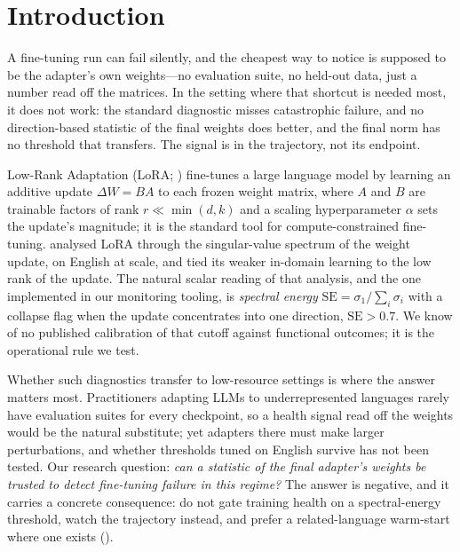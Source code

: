 \documentclass[11pt]{article}
\begin{document}
\section{Introduction}

A fine-tuning run can fail silently, and the cheapest way to notice is supposed to be the adapter's own weights---no evaluation suite, no held-out data, just a number read off the matrices. In the setting where that shortcut is needed most, it does not work: the standard diagnostic misses catastrophic failure, and no direction-based statistic of the final weights does better, and the final norm has no threshold that transfers. The signal is in the trajectory, not its endpoint.

Low-Rank Adaptation (LoRA; \citealp{hu2022lora}) fine-tunes a large language model by learning an additive update $\Delta W = BA$ to each frozen weight matrix, where $A$ and $B$ are trainable factors of rank $r \ll \min(d,k)$ and a scaling hyperparameter $\alpha$ sets the update's magnitude; it is the standard tool for compute-constrained fine-tuning. \citet{biderman2024lora} analysed LoRA through the singular-value spectrum of the weight update, on English at scale, and tied its weaker in-domain learning to the low rank of the update. The natural scalar reading of that analysis, and the one implemented in our monitoring tooling, is \emph{spectral energy} $\text{SE} = \sigma_1 / \sum_i \sigma_i$ with a collapse flag when the update concentrates into one direction, $\text{SE} > 0.7$. We know of no published calibration of that cutoff against functional outcomes; it is the operational rule we test.

Whether such diagnostics transfer to low-resource settings is where the answer matters most. Practitioners adapting LLMs to underrepresented languages rarely have evaluation suites for every checkpoint, so a health signal read off the weights would be the natural substitute; yet adapters there must make larger perturbations, and whether thresholds tuned on English survive has not been tested. Our research question: \emph{can a statistic of the final adapter's weights be trusted to detect fine-tuning failure in this regime?} The answer is negative, and it carries a concrete consequence: do not gate training health on a spectral-energy threshold, watch the trajectory instead, and prefer a related-language warm-start where one exists ().
\end{document}
